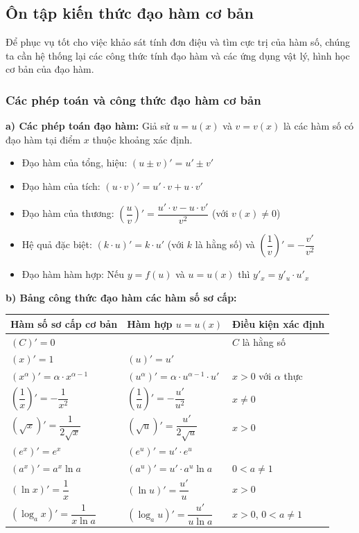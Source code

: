 \documentclass[12pt]{article}
\begin{document}
	\subsection{Ôn tập kiến thức đạo hàm cơ bản}
	
	Để phục vụ tốt cho việc khảo sát tính đơn điệu và tìm cực trị của hàm số, chúng ta cần hệ thống lại các công thức tính đạo hàm và các ứng dụng vật lý, hình học cơ bản của đạo hàm.
	
	\subsubsection{Các phép toán và công thức đạo hàm cơ bản}
	
	\textbf{a) Các phép toán đạo hàm:}
	Giả sử $u = u(x)$ và $v = v(x)$ là các hàm số có đạo hàm tại điểm $x$ thuộc khoảng xác định.
	\begin{itemize}
		\item Đạo hàm của tổng, hiệu: $(u \pm v)' = u' \pm v'$
		\item Đạo hàm của tích: $(u \cdot v)' = u' \cdot v + u \cdot v'$
		\item Đạo hàm của thương: $\left(\dfrac{u}{v}\right)' = \dfrac{u' \cdot v - u \cdot v'}{v^2}$ \quad (với $v(x) \neq 0$)
		\item Hệ quả đặc biệt: $(k \cdot u)' = k \cdot u'$ (với $k$ là hằng số) và $\left(\dfrac{1}{v}\right)' = -\dfrac{v'}{v^2}$
		\item Đạo hàm hàm hợp: Nếu $y = f(u)$ và $u = u(x)$ thì $y'_x = y'_u \cdot u'_x$
	\end{itemize}
	
	\textbf{b) Bảng công thức đạo hàm các hàm số sơ cấp:}
	
	\begin{center}
		\small
		\renewcommand{\arraystretch}{1.8}
		\begin{tabular}{p{5cm} p{7cm} p{4cm}}
			\toprule
			\textbf{Hàm số sơ cấp cơ bản} & \textbf{Hàm hợp $u = u(x)$} & \textbf{Điều kiện xác định} \\
			\midrule
			$(C)' = 0$ & & $C$ là hằng số \\
			$(x)' = 1$ & $(u)' = u'$ & \\
			$(x^\alpha)' = \alpha \cdot x^{\alpha - 1}$ & $(u^\alpha)' = \alpha \cdot u^{\alpha - 1} \cdot u'$ & $x > 0$ với $\alpha$ thực \\
			$\left(\dfrac{1}{x}\right)' = -\dfrac{1}{x^2}$ & $\left(\dfrac{1}{u}\right)' = -\dfrac{u'}{u^2}$ & $x \neq 0$ \\
			$(\sqrt{x})' = \dfrac{1}{2\sqrt{x}}$ & $(\sqrt{u})' = \dfrac{u'}{2\sqrt{u}}$ & $x > 0$ \\
			$(e^x)' = e^x$ & $(e^u)' = u' \cdot e^u$ & \\
			$(a^x)' = a^x \ln a$ & $(a^u)' = u' \cdot a^u \ln a$ & $0 < a \neq 1$ \\
			$(\ln x)' = \dfrac{1}{x}$ & $(\ln u)' = \dfrac{u'}{u}$ & $x > 0$ \\
			$(\log_a x)' = \dfrac{1}{x \ln a}$ & $(\log_a u)' = \dfrac{u'}{u \ln a}$ & $x > 0$, $0 < a \neq 1$ \\
			\bottomrule
		\end{tabular}
	\end{center}
	
\end{document}

